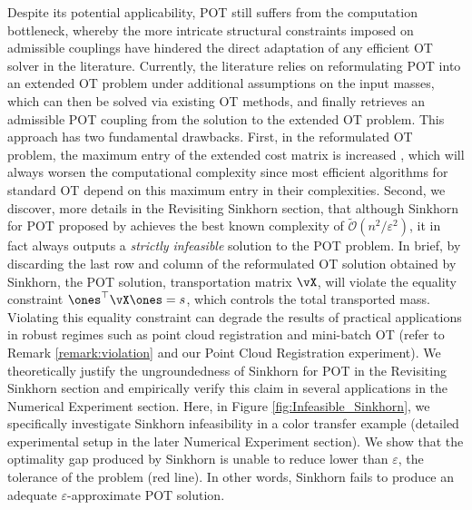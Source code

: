 Despite its potential applicability, POT still suffers from the computation bottleneck, whereby the more intricate structural constraints imposed on admissible couplings have hindered the direct adaptation of any efficient OT solver in the literature. Currently, the literature \citep{Chapel-nips2020, nhatho-mmpot} relies on reformulating POT into an extended OT problem under additional assumptions on the input masses, which can then be solved via existing OT methods, and finally retrieves an admissible POT coupling from the solution to the extended OT problem. This approach has two fundamental drawbacks. First, in the reformulated OT problem, the maximum entry of the extended cost matrix is increased \citep[Proposition 1]{Chapel-nips2020}, which will always worsen the computational complexity since most efficient algorithms for standard OT \citep{Dvurechensky-2018-Computational, lin2019efficient, guminov2021accelerated} depend on this maximum entry in their complexities. 
Second, we discover, more details in the Revisiting Sinkhorn section, that although Sinkhorn for POT proposed by \citep{nhatho-mmpot} achieves the best known complexity of $\mathcal{\widetilde O}(n^2/\varepsilon^2)$, it in fact always outputs a \emph{strictly infeasible} solution to the POT problem. In brief, by discarding the last row and column of the reformulated OT solution obtained by Sinkhorn, the POT solution, transportation matrix $\vX$, will violate the equality constraint $\ones^\top \vX \ones = s$, which controls the total transported mass. Violating this equality constraint can degrade the results of practical applications in robust regimes such as point cloud registration \citep{qin2022rigid} and mini-batch OT \citep{nguyen2022improving} (refer to Remark \ref{remark:violation} and our Point Cloud Registration experiment). We theoretically justify the ungroundedness of Sinkhorn for POT in the Revisiting Sinkhorn section and empirically verify this claim in several applications in the Numerical Experiment section. Here, in Figure \ref{fig:Infeasible_Sinkhorn}, we specifically investigate Sinkhorn infeasibility in a color transfer example (detailed experimental setup in the later Numerical Experiment section). We show that the optimality gap produced by Sinkhorn is unable to reduce lower than $\varepsilon$, the tolerance of the problem (red line). In other words, Sinkhorn fails to produce an adequate $\varepsilon$-approximate POT solution. 

